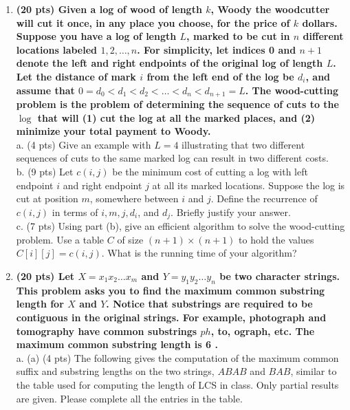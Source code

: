 \documentclass[a4paper,11pt,oneside]{book}
\begin{document}
\begin{enumerate}
  \item {\textbf{(20 pts) Given a log of wood of length $k$, Woody the woodcutter will cut it once, in any place you choose, for the price of $k$ dollars. Suppose you have a log of length $L$, marked to be cut in $n$ different locations labeled $1,2, \ldots, n$. For simplicity, let indices 0 and $n+1$ denote the left and right endpoints of the original log of length $L$. Let the distance of mark $i$ from the left end of the log be $d_i$, and assume that $0=d_0<d_1<d_2<\ldots<d_n<d_{n+1}=L$. The wood-cutting problem is the problem of determining the sequence of cuts to the $\log$ that will (1) cut the log at all the marked places, and (2) minimize your total payment to Woody.}}
  \\ a. (4 pts) Give an example with $L=4$ illustrating that two different sequences of cuts to the same marked log can result in two different costs.
  \\ b. (9 pts) Let $c(i, j)$ be the minimum cost of cutting a log with left endpoint $i$ and right endpoint $j$ at all its marked locations. Suppose the log is cut at position $m$, somewhere between $i$ and $j$. Define the recurrence of $c(i, j)$ in terms of $i, m, j, d_i$, and $d_j$. Briefly justify your answer.
  \\ c. (7 pts) Using part (b), give an efficient algorithm to solve the wood-cutting problem. Use a table $C$ of size $(n+1) \times(n+1)$ to hold the values $C[i][j]=c(i, j)$. What is the running time of your algorithm?
  
  \item {\textbf{(20 pts) Let $X=x_1 x_2 \ldots x_m$ and $Y=y_1 y_2 \ldots y_n$ be two character strings. This problem asks you to find the maximum common substring length for $X$ and $Y$. Notice that substrings are required to be contiguous in the original strings. For example, photograph and tomography have common substrings $p h$, to, ograph, etc. The maximum common substring length is 6 .}}
  \\ a. (a) (4 pts) The following gives the computation of the maximum common suffix and substring lengths on the two strings, $A B A B$ and $B A B$, similar to the table used for computing the length of LCS in class. Only partial results are given. Please complete all the entries in the table.

\end{enumerate}
\end{document}
